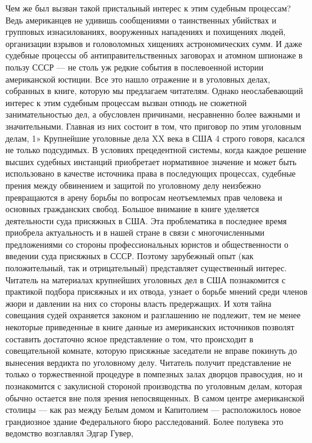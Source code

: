 \documentclass[12pt, a4paper, openany]{book}
\begin{document}
Чем же был вызван такой пристальный интерес к этим судебным процессам? Ведь американцев не удивишь  сообщениями о таинственных убийствах и групповых  изнасилованиях, вооруженных нападениях и похищениях людей, 
организации взрывов и головоломных хищениях  
астрономических сумм. И даже судебные процессы об  
антиправительственных заговорах и атомном шпионаже в пользу 
СССР — не столь уж редкие события в послевоенной 
истории американской юстиции. Все это нашло отражение 
и в уголовных делах, собранных в книге, которую мы 
предлагаем читателям. Однако неослабевающий интерес 
к этим судебным процессам вызван отнюдь не сюжетной 
занимательностью дел, а обусловлен причинами,  
несравненно более важными и значительными. Главная из них 
состоит в том, что приговор по этим уголовным делам, 
1» 
Крупнейшие уголовные дела XX века в США 
4 
строго говоря, касался не только подсудимых. В условиях 
прецедентной системы, когда каждое решение высших 
судебных инстанций приобретает нормативное значение 
и может быть использовано в качестве источника права 
в последующих процессах, судебные прения между  
обвинением и защитой по уголовному делу неизбежно  
превращаются в арену борьбы по вопросам неотъемлемых прав 
человека и основных гражданских свобод. 
Большое внимание в книге уделяется деятельности 
суда присяжных в США. Эта проблематика в последнее 
время приобрела актуальность и в нашей стране в связи 
с многочисленными предложениями со стороны  
профессиональных юристов и общественности о введении суда 
присяжных в СССР. Поэтому зарубежный опыт (как 
положительный, так и отрицательный) представляет  
существенный интерес. Читатель на материалах крупнейших 
уголовных дел в США познакомится с практикой подбора 
присяжных и их отвода, узнает о борьбе мнений среди 
членов жюри и давлении на них со стороны власть 
предержащих. И хотя тайна совещания судей охраняется 
законом и разглашению не подлежит, тем не менее 
некоторые приведенные в книге данные из американских 
источников позволят составить достаточно ясное  
представление о том, что происходит в совещательной комнате, 
которую присяжные заседатели не вправе покинуть до 
вынесения вердикта по уголовному делу. 
Читатель получит представление не только о  
торжественной процедуре в помпезных залах дворцов правосудия, 
но и познакомится с закулисной стороной производства по 
уголовным делам, которая обычно остается вне поля 
зрения непосвященных. 
В самом центре американской столицы — как раз 
между Белым домом и Капитолием — расположилось 
новое грандиозное здание Федерального бюро  
расследований. Более полувека это ведомство возглавлял Эдгар Гувер, 
\end{document}
